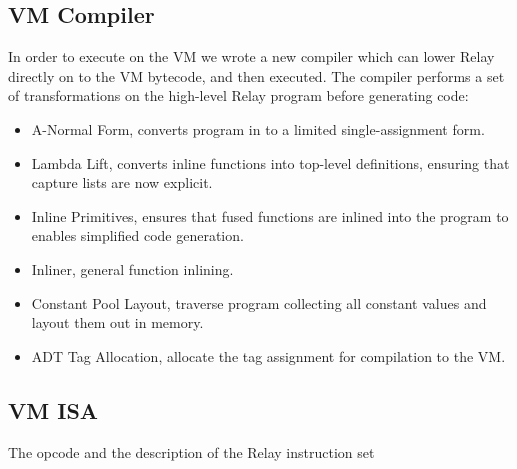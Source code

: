 \subsection{VM Compiler}

In order to execute on the VM we wrote a new compiler which
  can lower Relay directly on to the VM bytecode, and then
  executed.
The compiler performs a set of transformations on the high-level
  Relay program before generating code:
\begin{itemize}
  \item A-Normal Form, converts program in to a limited single-assignment form.
  \item Lambda Lift, converts inline functions into top-level definitions,
        ensuring that capture lists are now explicit.
  \item Inline Primitives, ensures that fused functions are inlined into
        the program to enables simplified code generation.
  \item Inliner, general function inlining.
  \item Constant Pool Layout, traverse program collecting all constant values
        and layout them out in memory.
  \item ADT Tag Allocation, allocate the tag assignment for compilation
        to the VM.
\end{itemize}


\subsection{VM ISA}

\begin{table*}[th]
\centering
\small

\caption{The opcode and the description of the Relay instruction set \label{tab:isa}}
\end{table*}


